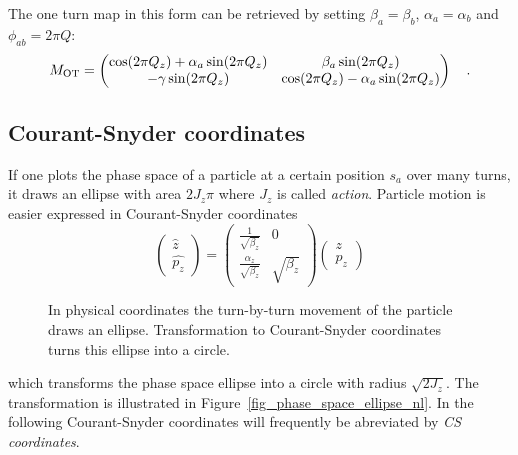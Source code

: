 The one turn map in this form can be retrieved by setting $\beta_a = \beta_b $, ${\alpha_a = \alpha_b}$
and ${\phi_{ab} = 2\pi Q}$:
%
\begin{equation}
    M_\text{OT} = \begin{pmatrix}
        \cos(2\pi Q_z) + \alpha_a \sin(2\pi Q_z) & \beta_a\sin(2\pi Q_z) \\
        -\gamma\sin(2\pi Q_z) & \cos(2\pi Q_z) - \alpha_a\sin(2\pi Q_z)
    \end{pmatrix}
    \quad .
\end{equation}
%

\subsection{Courant-Snyder coordinates}
\label{sec_intro_cs}
If one plots the phase space of a particle at a certain position $s_a$ over many turns, it draws an
ellipse with area $2J_z\pi$ where $J_z$ is called \emph{action}.
Particle motion is easier expressed in Courant-Snyder coordinates \cite{Courant1958, Bazzani1994}
%
\begin{equation}
    \begin{pmatrix}
        \hat{z}\\
        \hat{p_z}
    \end{pmatrix}
    =
    \begin{pmatrix}
        \frac{1}{\sqrt{\beta_z}} & 0\\
        \frac{\alpha_z}{\sqrt{\beta_z}} & \sqrt{\beta_z}
    \end{pmatrix}
    \begin{pmatrix}
        z\\
        p_z
    \end{pmatrix}
    \label{eq_cs_matrix}
\end{equation}
%
\begin{figure}[ht]
    \centering
    
    \hspace{1cm}
    
    \caption{In physical coordinates the turn-by-turn movement of the particle draws an ellipse.
        Transformation to Courant-Snyder
        coordinates turns this ellipse into a circle.}
    \label{fig_phase_space_ellipse}
\end{figure}
%
which transforms the phase space ellipse into a circle with radius $\sqrt{2J_z}$.
The transformation is illustrated in Figure~\ref{fig_phase_space_ellipse_nl}.
In the following Courant-Snyder coordinates will frequently be abreviated by \emph{CS coordinates}.

